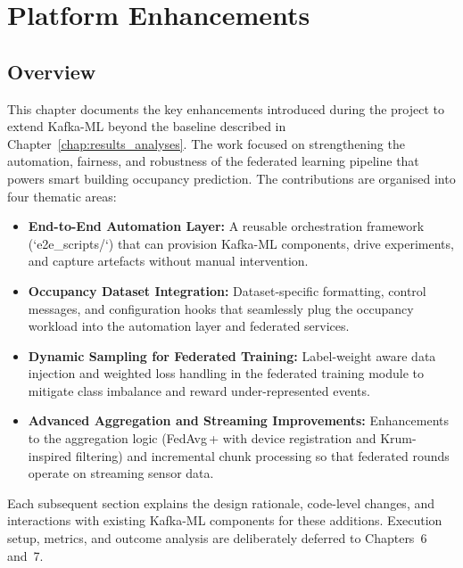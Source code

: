 \chapter{Platform Enhancements}

\section{Overview}

This chapter documents the key enhancements introduced during the project to extend Kafka-ML beyond the baseline described in Chapter~\ref{chap:results_analyses}. The work focused on strengthening the automation, fairness, and robustness of the federated learning pipeline that powers smart building occupancy prediction. The contributions are organised into four thematic areas:

\begin{itemize}
    \item \textbf{End-to-End Automation Layer:} A reusable orchestration framework (`e2e\_scripts/`) that can provision Kafka-ML components, drive experiments, and capture artefacts without manual intervention.
    \item \textbf{Occupancy Dataset Integration:} Dataset-specific formatting, control messages, and configuration hooks that seamlessly plug the occupancy workload into the automation layer and federated services.
    \item \textbf{Dynamic Sampling for Federated Training:} Label-weight aware data injection and weighted loss handling in the federated training module to mitigate class imbalance and reward under-represented events.
    \item \textbf{Advanced Aggregation and Streaming Improvements:} Enhancements to the aggregation logic (FedAvg\,+ with device registration and Krum-inspired filtering) and incremental chunk processing so that federated rounds operate on streaming sensor data.
\end{itemize}

Each subsequent section explains the design rationale, code-level changes, and interactions with existing Kafka-ML components for these additions. Execution setup, metrics, and outcome analysis are deliberately deferred to Chapters~6 and~7.

